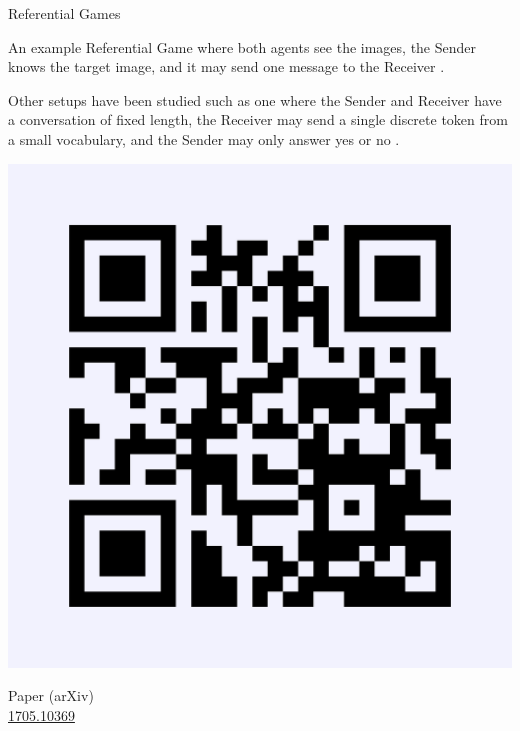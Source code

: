 \documentclass[final]{beamer}
\newlength{\onecolwid}
\begin{document}
\begin{frame}[t]
\begin{columns}[t]
\begin{column}{\onecolwid}
\begin{block}{Referential Games}
\vspace{5mm}

An example Referential Game where both agents see the images, the Sender knows the target image, and it may send one message to the Receiver \cite{Lazaridou:2017multi}.

\vspace{5mm}

Other setups have been studied such as one where the Sender and Receiver have a conversation of fixed length, the Receiver may send a single discrete token from a small vocabulary, and the Sender may only answer yes or no \cite{Jorge:2016learning}.

\end{block}

\vspace{5mm}

\begin{tcolorbox}[colback=blue!5!white,colframe=blue!75!black]

\begin{minipage}{.3\textwidth}
\includegraphics[width=\textwidth]{links/qr_paper_blue_bg}
\end{minipage} \quad
\begin{minipage}{.6\textwidth}
  Paper (arXiv) \\
  \href{https://arxiv.org/abs/1705.10369}{1705.10369}
\end{minipage}


\end{tcolorbox}
\end{column}
\end{columns}
\end{frame}
\end{document}
